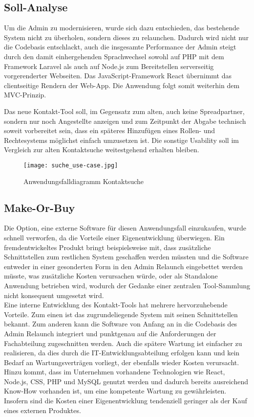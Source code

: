 \subsection{Soll-Analyse}
    Um die Admin zu modernisieren, wurde sich dazu entschieden, das bestehende System nicht zu überholen, sondern dieses zu relaunchen. Dadurch wird nicht nur die Codebasis entschlackt, auch die insgesamte Performance der Admin steigt durch den damit einhergehenden Sprachwechsel sowohl auf PHP mit dem Framework \glqq Laravel\grqq{} als auch auf Node.js zum Bereitstellen serverseitig vorgerenderter Webseiten. Das JavaScript-Framework \glqq React\grqq{} übernimmt das \mbox{clientseitige} Rendern der Web-App. Die Anwendung folgt somit weiterhin dem MVC-Prinzip.

    \vfill
    \pagebreak

    Das neue Kontakt-Tool soll, im Gegensatz zum alten, auch keine Spreadpartner, sondern nur noch Angestellte anzeigen und zum Zeitpunkt der Abgabe technisch soweit vorbereitet sein, dass ein späteres Hinzufügen eines Rollen- und Rechtesystems möglichst einfach umzusetzen ist. Die sonstige Usability soll im Vergleich zur alten Kontaktsuche weitestgehend erhalten bleiben.

    \begin{figure}[h]
        \centering
        \texttt{[image: suche\_use-case.jpg]}
        \caption{Anwendungsfalldiagramm \glqq Kontaktsuche\grqq{}}
    \end{figure}

\subsection{Make-Or-Buy}
    Die Option, eine externe Software für diesen Anwendungsfall einzukaufen, wurde schnell verworfen, da die Vorteile einer Eigenentwicklung überwiegen. Ein fremdentwickeltes Produkt bringt beispielsweise mit, dass zusätzliche Schnittstellen zum restlichen System geschaffen werden müssten und die Software entweder in einer gesonderten Form in den Admin Relaunch eingebettet werden müsste, was zusätzliche Kosten verursachen würde, oder als Standalone Anwendung betrieben wird, wodurch der Gedanke einer zentralen Tool-Sammlung nicht konsequent umgesetzt wird.\\
    Eine interne Entwicklung des Kontakt-Tools hat mehrere hervorzuhebende Vorteile. Zum einen ist das zugrundeliegende System mit seinen Schnittstellen bekannt. Zum anderen kann die Software von Anfang an in die Codebasis des Admin Relaunch integriert und punktgenau auf die Anforderungen der Fachabteilung zugeschnitten werden. Auch die spätere Wartung ist einfacher zu realisieren, da dies durch die IT-Entwicklungsabteilung erfolgen kann und kein Bedarf an Wartungsverträgen vorliegt, der ebenfalls wieder Kosten verursacht. Hinzu kommt, dass im Unternehmen vorhandene Technologien wie React, Node.js, CSS, PHP und MySQL genutzt werden und dadurch bereits ausreichend Know-How vorhanden ist, um eine kompetente Wartung zu gewährleisten. Insofern sind die Kosten einer Eigenentwicklung tendenziell geringer als der Kauf eines externen Produktes.\\


